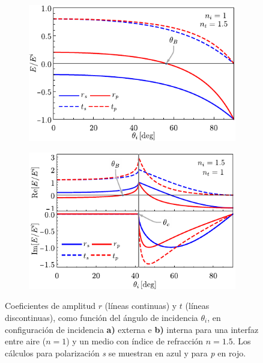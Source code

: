 \begin{figure}[h!]\centering\hspace*{-1.5em}
	\begin{subfigure}{.05\textwidth}\vspace{-4.5cm}\caption{}\label{sfig:coefExt}\end{subfigure}
	\begin{subfigure}{.43\textwidth} \hspace*{-.8cm}
	\includegraphics[scale=1]{1-Teoria/figs/1-1-ampCoefExt}
	\end{subfigure}
	\begin{subfigure}{.05\textwidth}\vspace{-4.5cm}\caption{}\label{sfig:coefInt}\end{subfigure}
	\begin{subfigure}{.43\textwidth} \hspace*{-.9cm}
	\includegraphics[scale=1]{1-Teoria/figs/1-1-ampCoefInt}
	\end{subfigure}\vspace*{-.7em}
	\caption{ Coeficientes de amplitud $r$ (líneas continuas) y $t$ (líneas discontinuas), como función del ángulo de incidencia $\theta_i$, en configuración de incidencia \textbf{a)} externa e \textbf{b)} interna para una interfaz entre  aire ($n=1$) y un medio con índice de refracción $n = 1.5$. Los cálculos para polarización  \emph{s} se muestran  en azul y  para \emph{p} en rojo. }	\label{fig:coefAmp}	
	\end{figure}	

